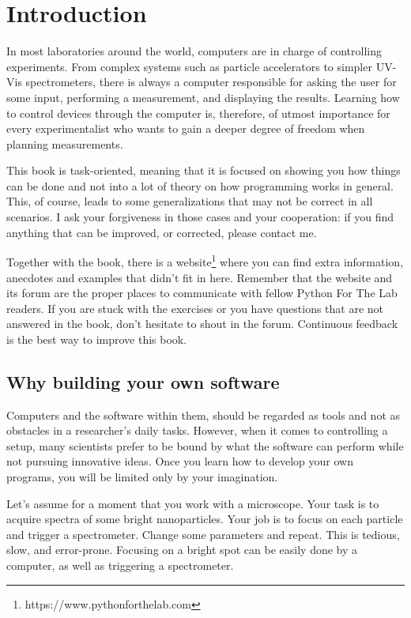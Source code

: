 \chapter{Introduction}
In most laboratories around the world, computers are in charge of controlling experiments. From complex systems such as particle accelerators to simpler UV-Vis spectrometers, there is always a computer responsible for asking the user for some input, performing a measurement, and displaying the results. Learning how to control devices through the computer is, therefore, of utmost importance for every experimentalist who wants to gain a deeper degree of freedom when planning measurements. 

This book is task-oriented, meaning that it is focused on showing you how things can be done and not into a lot of theory on how programming works in general. This, of course, leads to some generalizations that may not be correct in all scenarios. I ask your forgiveness in those cases and your cooperation: if you find anything that can be improved, or corrected, please contact me.

Together with the book, there is a website\footnote{https://www.pythonforthelab.com} where you can find extra information, anecdotes and examples that didn’t fit in here. Remember that the website and its forum are the proper places to communicate with fellow Python For The Lab readers. If you are stuck with the exercises or you have questions that are not answered in the book, don’t hesitate to shout in the forum. Continuous feedback is the best way to improve this book. 

\section{Why building your own software}
Computers and the software within them, should be regarded as tools and not as obstacles in a researcher's daily tasks. However, when it comes to controlling a setup, many scientists prefer to be bound by what the software can perform while not pursuing innovative ideas. Once you learn how to develop your own programs, you will be limited only by your imagination. 

Let's assume for a moment that you work with a microscope. Your task is to acquire spectra of some bright nanoparticles. Your job is to focus on each particle and trigger a spectrometer. Change some parameters and repeat. This is tedious, slow, and error-prone. Focusing on a bright spot can be easily done by a computer, as well as triggering a spectrometer. 

